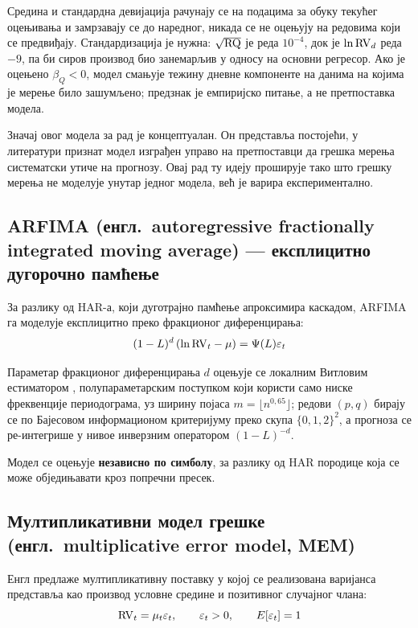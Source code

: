 Средина и стандардна девијација рачунају се на подацима за обуку текућег оцењивања и
замрзавају се до наредног, никада се не оцењују на редовима који се предвиђају.
Стандардизација је нужна: $\sqrt{\mathrm{RQ}}$ је реда $10^{-4}$, док је $\ln\mathrm{RV}_d$ реда
$-9$, па би сиров производ био занемарљив у односу на основни регресор. Ако је оцењено $\beta_Q < 0$, модел смањује тежину дневне компоненте на
данима на којима је мерење било зашумљено; предзнак је емпиријско питање, а не
претпоставка модела.

Значај овог модела за рад је концептуалан. Он представља постојећи, у литератури
признат модел изграђен управо на претпоставци да грешка мерења систематски утиче на
прогнозу. Овај рад ту идеју проширује тако што грешку мерења не моделује унутар једног
модела, већ је варира експериментално.

\subsection[ARFIMA — експлицитно дугорочно памћење]{ARFIMA (енгл.\ autoregressive
fractionally integrated moving average) — експлицитно дугорочно памћење}

За разлику од HAR-а, који дуготрајно памћење апроксимира каскадом, ARFIMA га моделује
експлицитно преко фракционог диференцирања:
\begin{equation}
(1-L)^{d}\left(\ln\mathrm{RV}_t - \mu\right) = \Psi(L)\varepsilon_t
\end{equation}

Параметар фракционог диференцирања $d$ оцењује се локалним Витловим естиматором
\parencite{robinson1995}, полупараметарским поступком који користи само ниске
фреквенције периодограма, уз ширину појаса $m = \lfloor n^{0{,}65}\rfloor$; редови
$(p,q)$ бирају се по Бајесовом информационом критеријуму преко скупа $\{0,1,2\}^{2}$, а
прогноза се ре-интегрише у нивое инверзним оператором $(1-L)^{-d}$.

Модел се оцењује \textbf{независно по симболу}, за разлику од HAR породице која се
може обједињавати кроз попречни пресек.

\subsection[Мултипликативни модел грешке (MEM)]{Мултипликативни модел грешке
(енгл.\ multiplicative error model, MEM)}
\label{subsec:mem}

Енгл \parencite{engle2002} предлаже мултипликативну поставку у којој се реализована
варијанса представља као производ условне средине и позитивног случајног члана:
\begin{equation}
\mathrm{RV}_t = \mu_t\varepsilon_t,
\qquad \varepsilon_t > 0,
\qquad E[\varepsilon_t] = 1
\end{equation}

